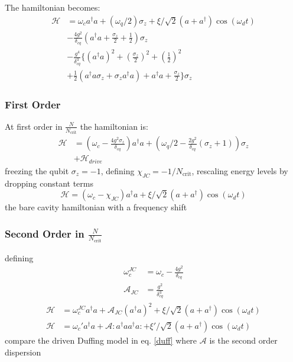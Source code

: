 The hamiltonian becomes:
\begin{align}
    \mathscr{H} &= \omega_c a ^ \dagger a
    + (\omega_q/2) \sigma_z
    +  \xi/\sqrt{2} (a + a^\dagger) \cos(\omega_d t)\\
    &- \frac{4g^2}{\delta_{cq}}\left(a^\dagger a 
    +  \frac{\sigma_z}{2} + \frac{1}{2}\right)\sigma_z\\
    &- \frac{g^4}{\delta_{cq}^3}\Big\{
    \left(a^\dagger a\right)^2
    + \left(\frac{\sigma_z}{2}\right)^2
    + \left(\frac{1}{2}\right)^2\\
    &+ \frac{1}{2} \left(
                    a^\dagger a \sigma_z + \sigma_z a^\dagger a
                  \right)
    + a^\dagger a + \frac{\sigma_z}{2}
    \Big\} 
    \sigma_z
\end{align}
\subsubsection{First Order}
At first order in $\frac{N}{N_{\text{crit}}}$ the hamiltonian is:
\begin{align}
  \mathscr{H} &= (\omega_c
    - \frac{4g^2\sigma_z}{\delta_{cq}}) a ^ \dagger a
    + (\omega_q/2 - \frac{2g^2}{\delta_{cq}} (\sigma_z + 1))\sigma_z\nonumber\\
    &+ \mathscr{H}_{drive}
\end{align}
freezing the qubit $\sigma_z=-1$,
defining $\chi_{JC} = -1/N_{\text{crit}}$,
rescaling energy levels by dropping constant terms
\begin{equation}
    \mathscr{H} = \left(\omega_c-\chi_{JC}\right) a ^ \dagger a
    + \xi/\sqrt{2} ( a + a^\dagger ) \cos(\omega_d t)
\end{equation}
the bare cavity hamiltonian with a frequency shift

\subsubsection{Second Order in $\frac{N}{N_{\text{crit}}}$}
defining
\begin{align}
    \omega_c^{JC} &= \omega_c - \frac{4g^2}{\delta_{cq}}\\
    \mathscr{A}_{JC} &= \frac{g^2}{\delta_{cq}^3}
\end{align}
\begin{align}
    \mathscr{H} &= \omega_c^{JC} a ^ \dagger a
    + \mathscr{A}_{JC}\left(a^\dagger a\right)^2
    + \xi/\sqrt{2} ( a + a^\dagger ) \cos(\omega_d t)\\
    \mathscr{H} &= \omega_c' a^\dagger a
    + \mathscr{A} : a ^ \dagger a a ^ \dagger a :
    + \xi'/\sqrt{2}(a+a^\dagger)\cos(\omega_d t)\label{duff}
\end{align}
compare the driven Duffing model in eq. \ref{duff}
where $\mathscr{A}$ is the second order dispersion\cite{Drummond1979}

